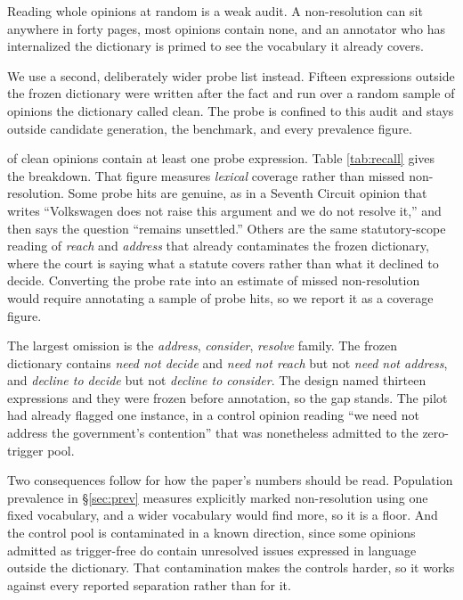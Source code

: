 Reading whole opinions at random is a weak audit. A non-resolution can sit
anywhere in forty pages, most opinions contain none, and an annotator who has
internalized the dictionary is primed to see the vocabulary it already covers.

We use a second, deliberately wider probe list instead. Fifteen expressions
outside the frozen dictionary were written after the fact and run over a random
sample of \RecallSampled{} opinions the dictionary called clean. The probe is confined to this
audit and stays outside candidate generation, the benchmark, and every prevalence
figure.

\RecallHit{} of clean opinions contain at least one probe expression. Table
\ref{tab:recall} gives the breakdown. That figure measures \emph{lexical}
coverage rather than missed non-resolution. Some probe hits are genuine, as in a
Seventh Circuit opinion that writes ``Volkswagen does not raise this argument and
we do not resolve it,'' and then says the question ``remains unsettled.'' Others
are the same statutory-scope reading of \emph{reach} and \emph{address} that
already contaminates the frozen dictionary, where the court is saying what a
statute covers rather than what it declined to decide. Converting the probe rate
into an estimate of missed non-resolution would require annotating a sample of
probe hits, so we report it as a coverage figure.

The largest omission is the \emph{address}, \emph{consider}, \emph{resolve}
family. The frozen dictionary contains \emph{need not decide} and \emph{need not
reach} but not \emph{need not address}, and \emph{decline to decide} but not
\emph{decline to consider}. The design named thirteen expressions and they were
frozen before annotation, so the gap stands. The pilot had already flagged one
instance, in a control opinion reading ``we need not address the government's
contention'' that was nonetheless admitted to the zero-trigger pool.

Two consequences follow for how the paper's numbers should be read. Population
prevalence in \S\ref{sec:prev} measures explicitly marked non-resolution using one
fixed vocabulary, and a wider vocabulary would find more, so it is a floor. And
the control pool is contaminated in a known direction, since some opinions
admitted as trigger-free do contain unresolved issues expressed in language
outside the dictionary. That contamination makes the controls harder, so it works
against every reported separation rather than for it.


